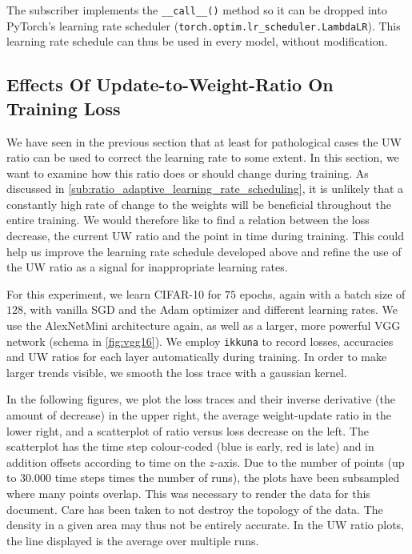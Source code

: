 The subscriber implements the \verb+__call__()+ method so it can be dropped into
PyTorch's learning rate scheduler (\verb+torch.optim.lr_scheduler.LambdaLR+).
This learning rate schedule can thus be used in every model, without modification.


\subsection{Effects Of Update-to-Weight-Ratio On Training Loss}%
\label{sub:effects_update_to_weight_ratio_on_training_loss}

We have seen in the previous section that at least for pathological cases the UW
ratio can be used to correct the learning rate to some extent. In this section,
we want to examine how this ratio does or should change during training. As
discussed in \cref{sub:ratio_adaptive_learning_rate_scheduling}, it is unlikely
that a constantly high rate of change to the weights will be beneficial
throughout the entire training. We would therefore like to find a relation
between the loss decrease, the current UW ratio and the point in time during
training. This could help us improve the learning rate schedule developed above
and refine the use of the UW ratio as a signal for inappropriate learning rates.

For this experiment, we learn CIFAR-10 for $75$ epochs, again with a batch size
of $128$, with vanilla SGD and the Adam optimizer and different learning rates.
We use the AlexNetMini architecture again, as well as a larger, more powerful
VGG network (schema in \cref{fig:vgg16}). We employ \verb+ikkuna+ to record
losses, accuracies and UW ratios for each layer automatically during training.
In order to make larger trends visible, we smooth the loss trace with a gaussian
kernel.

In the following figures, we plot the loss traces and their inverse derivative
(the amount of decrease) in the upper right, the average weight-update ratio in
the lower right, and a scatterplot of ratio versus loss decrease on the left.
The scatterplot has the time step colour-coded (blue is early, red is late) and
in addition offsets according to time on the $z$-axis. Due to the number of
points (up to $30.000$ time steps times the number of runs), the plots have been
subsampled where many points overlap. This was necessary to render the data for
this document. Care has been taken to not destroy the topology of the data.  The
density in a given area may thus not be entirely accurate. In the UW ratio
plots, the line displayed is the average over multiple runs.

